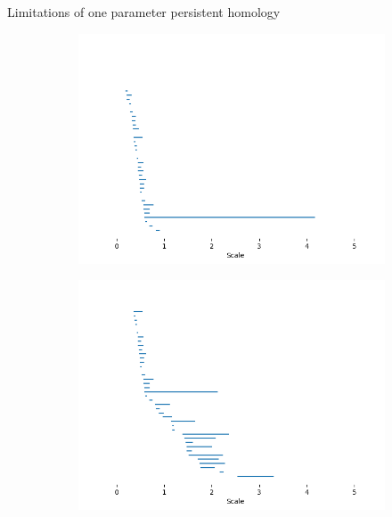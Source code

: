 \documentclass{beamer}
\begin{document}
\begin{frame}{Limitations of one parameter persistent homology}
\begin{figure}[h]
\begin{subfigure}{.45\textwidth}
              \includegraphics[width=.9\linewidth]{./figures/barcode-circle}
              \label{fig:barcode-circle}
            \end{subfigure}
            \begin{subfigure}{.45\textwidth}
              \centering
              \includegraphics[width=.9\linewidth]{./figures/barcode-all-points}
              \label{fig:barcode-all}
            \end{subfigure}
            \caption{\cite{botnanLesnick_2022}}
            \label{fig:circles-full}
        \end{figure}
    \end{frame}
\end{document}
